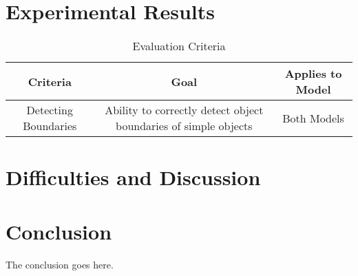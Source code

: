 \documentclass[12pt,journal,letterpaper,compsoc]{IEEEtran}
\begin{document}
\section{Experimental Results}
\label{sec:results}

\begin{table*}[h!t!]
\centering
\begin{tabular}{ c | c |c}
\textbf{Criteria} & \textbf{Goal} & \textbf{Applies to Model}\\
\hline\hline
Detecting Boundaries & Ability to correctly detect object boundaries of simple objects& Both Models\\
\hline
\end{tabular}
\centering
\caption{Evaluation Criteria}
\label{tab:criteria}
\end{table*}

\section{Difficulties and Discussion}
\label{sec:difficulties}

\section{Conclusion}
\label{sec:conc}
The conclusion goes here.




\end{document}
